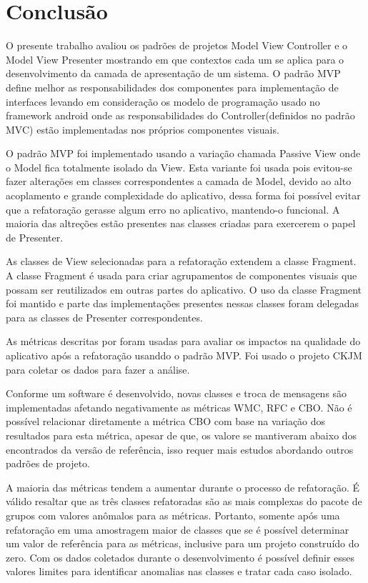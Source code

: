 \chapter{Conclusão} 

O presente trabalho avaliou os padrões de projetos Model View Controller e o
Model View Presenter mostrando em que contextos cada um se aplica para o
desenvolvimento da camada de apresentação de um sistema.
O padrão MVP define melhor as responsabilidades dos componentes para
implementação de interfaces levando em consideração os modelo de programação
usado no framework android onde as responsabilidades do Controller(definidos no
padrão MVC) estão implementadas nos próprios componentes visuais.

O padrão MVP foi implementado usando a variação chamada Passive View onde o
Model fica totalmente isolado da View. Esta variante foi usada pois evitou-se
fazer alterações em classes correspondentes a camada de Model, devido ao alto
acoplamento e grande complexidade do aplicativo, dessa forma foi possível evitar
que a refatoração gerasse algum erro no aplicativo, mantendo-o funcional. A
maioria das altreções estão presentes nas classes criadas para exercerem o papel
de Presenter.

As classes de View selecionadas para a refatoração extendem a classe Fragment.
A classe Fragment é usada para criar agrupamentos de componentes visuais que
possam ser reutilizados em outras partes do aplicativo. O uso da classe
Fragment foi mantido e parte das implementações presentes nessas classes foram
delegadas para as classes de Presenter correspondentes.

As métricas descritas por  foram usadas para avaliar os
impactos na qualidade do aplicativo após a refatoração usanddo o padrão MVP. Foi
usado o projeto CKJM para coletar os dados para fazer a análise.

Conforme um software é desenvolvido, novas classes e troca de mensagens são
implementadas afetando negativamente as métricas WMC, RFC e CBO. Não é possível
relacionar diretamente a métrica CBO com base na variação dos resultados para
esta métrica, apesar de que, os valore se mantiveram abaixo dos encontrados da
versão de referência, isso requer mais estudos abordando outros padrões de projeto.

A maioria das métricas tendem a aumentar durante o processo de refatoração. 
É válido resaltar que as três classes refatoradas são as mais complexas do
pacote de grupos com valores anômalos para as métricas. Portanto, somente após
uma refatoração em uma amostragem maior de classes que se é possível determinar
um valor de referência para as métricas, inclusive para um projeto construído
do zero. Com os dados coletados durante o desenvolvimento é possível definir
esses valores limites para identificar anomalias nas classes e tratar cada caso
isolado.

